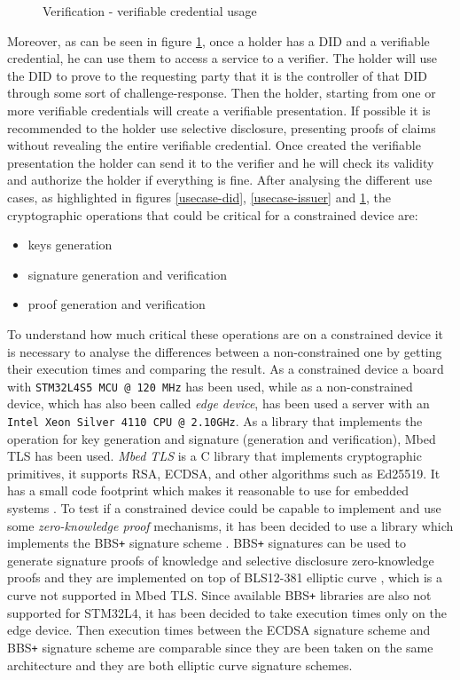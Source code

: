\begin{figure}[!h]
    \centering
    
    \caption{Verification - verifiable credential usage}
    \label{usecase-verifier}
\end{figure}

Moreover, as can be seen in figure \ref{usecase-verifier}, once a holder has a DID and a verifiable credential, he can use them to access a service to a verifier. The holder will use the DID to prove to the requesting party that it is the controller of that DID through some sort of challenge-response. Then the holder, starting from one or more verifiable credentials will create a verifiable presentation. If possible it is recommended to the holder use selective disclosure, presenting proofs of claims without revealing the entire verifiable credential. Once created the verifiable presentation the holder can send it to the verifier and he will check its validity and authorize the holder if everything is fine.  
After analysing the different use cases, as highlighted in figures \ref{usecase-did}, \ref{usecase-issuer} and \ref{usecase-verifier}, the cryptographic operations that could be  critical for a constrained device are:
\begin{itemize}
    \item keys generation
    \item signature generation and verification
    \item proof generation and verification
\end{itemize}

To understand how much critical these operations are on a constrained device it is necessary to analyse the differences between a non-constrained one by getting their execution times and comparing the result. 
As a constrained device a board with \texttt{STM32L4S5 MCU @ 120 MHz} has been used, while as a non-constrained device, which has also been called \textit{edge device}, has been used a server with an \texttt{Intel Xeon Silver 4110 CPU @ 2.10GHz}. As a library that implements the operation for key generation and signature (generation and verification), Mbed TLS has been used. \textit{Mbed TLS} is a C library that implements cryptographic primitives, it supports RSA, ECDSA, and other algorithms such as Ed25519. It has a small code footprint which makes it reasonable to use for embedded systems \cite{mbed-tls}. To test if a constrained device could be capable to implement and use some \textit{zero-knowledge proof} mechanisms, it has been decided to use a library which implements the BBS\texttt{+} signature scheme \cite{bbsplus}. BBS\texttt{+} signatures can be used to generate signature proofs of knowledge and selective disclosure zero-knowledge proofs \cite{bbs-rust} and they are implemented on top of BLS12-381 elliptic curve \cite{bls-curve}, which is a curve not supported in Mbed TLS. Since available BBS\texttt{+} libraries are also not supported for STM32L4, it has been decided to take execution times only on the edge device. Then execution times between the ECDSA signature scheme and BBS\texttt{+} signature scheme are comparable since they are been taken on the same architecture and they are both elliptic curve signature schemes.

